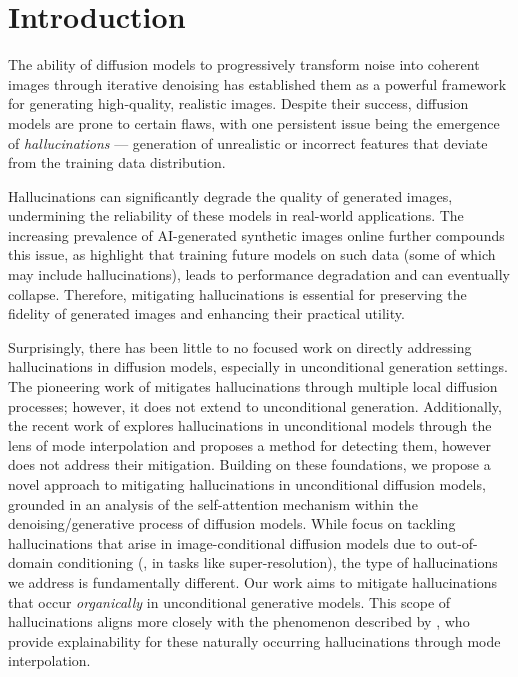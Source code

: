 \section{Introduction}
\label{sec:intro}

The ability of diffusion models \citep{ho2020ddpm,rombach2022sd,ramesh2022hierarchical} to progressively transform noise into coherent images through iterative denoising has established them as a powerful framework for generating high-quality, realistic images.
Despite their success, diffusion models are prone to certain flaws, with one persistent issue being the emergence of \textit{hallucinations} ---  generation of unrealistic or incorrect features that deviate from the training data distribution. 

Hallucinations can significantly degrade the quality of generated images, undermining the reliability of these models in real-world applications.
The increasing prevalence of AI-generated synthetic images online \citep{bender2023peacock} further compounds this issue, as \citet{aithal2024understanding} highlight that training future models on such data (some of which may include hallucinations), leads to performance degradation and can eventually collapse. 
Therefore, mitigating hallucinations is essential for preserving the fidelity of generated images and enhancing their practical utility.

Surprisingly, there has been little to no focused work on directly addressing hallucinations in diffusion models, especially in unconditional generation settings. 
The pioneering work of \citet{kim2024tackling} mitigates hallucinations through multiple local diffusion processes; however, it does not extend to unconditional generation. 
Additionally, the recent work of \citet{aithal2024understanding} explores hallucinations in unconditional models through the lens of mode interpolation and proposes a method for detecting them, however does not address their mitigation. 
Building on these foundations, we propose a novel approach to mitigating hallucinations in unconditional diffusion models, grounded in an analysis of the self-attention mechanism within the denoising/generative process of diffusion models.
While \citet{kim2024tackling} focus on tackling hallucinations that arise in image-conditional diffusion models due to out-of-domain conditioning (\eg, in tasks like super-resolution), the type of hallucinations we address is fundamentally different. 
Our work aims to mitigate hallucinations that occur {\it organically} in unconditional generative models. 
This scope of hallucinations aligns more closely with the phenomenon described by \citet{aithal2024understanding}, who provide explainability for these naturally occurring hallucinations through mode interpolation.

